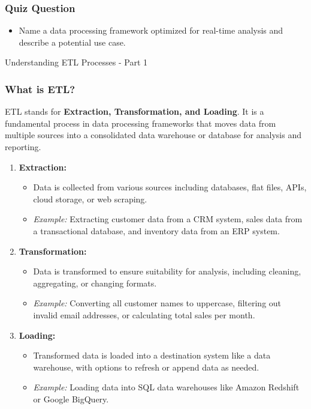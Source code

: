 \documentclass[aspectratio=169]{beamer}
\begin{document}
\begin{frame}[fragile]
    \frametitle{Quiz Question}
    \begin{itemize}
        \item Name a data processing framework optimized for real-time analysis and describe a potential use case.
    \end{itemize}
\end{frame}

\begin{frame}[fragile]{Understanding ETL Processes - Part 1}
    \frametitle{What is ETL?}
    ETL stands for \textbf{Extraction, Transformation, and Loading}. 
    It is a fundamental process in data processing frameworks that moves data from multiple sources into a consolidated data warehouse or database for analysis and reporting.

    \begin{enumerate}
        \item \textbf{Extraction:}
          \begin{itemize}
              \item Data is collected from various sources including databases, flat files, APIs, cloud storage, or web scraping.
              \item \textit{Example:} Extracting customer data from a CRM system, sales data from a transactional database, and inventory data from an ERP system.
          \end{itemize}

        \item \textbf{Transformation:}
          \begin{itemize}
              \item Data is transformed to ensure suitability for analysis, including cleaning, aggregating, or changing formats.
              \item \textit{Example:} Converting all customer names to uppercase, filtering out invalid email addresses, or calculating total sales per month.
          \end{itemize}

        \item \textbf{Loading:}
          \begin{itemize}
              \item Transformed data is loaded into a destination system like a data warehouse, with options to refresh or append data as needed.
              \item \textit{Example:} Loading data into SQL data warehouses like Amazon Redshift or Google BigQuery.
          \end{itemize}
    \end{enumerate}
\end{frame}
\end{document}
